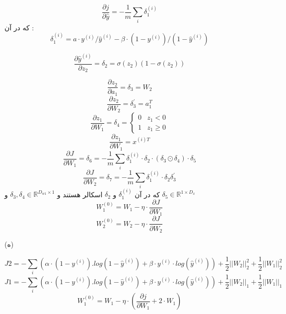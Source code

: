 \begin{equation}
    \frac{\partial j}{\partial \hat{y}} = -\frac{1}{m} \sum_{i} \delta_1^{(i)}    
\end{equation}
که در آن :
\begin{equation}
    \delta_1^{(i)} = a \cdot y^{(i)}/ \hat{y}^{(i)} - \beta \cdot (1-y^{(i)})/(1-\hat{y}^{(i)})
\end{equation}

\begin{equation}
    \frac{\partial \hat{y}^{(i)}}{\partial z_2} = \delta_2 = \sigma(z_2)(1-\sigma(z_2))
\end{equation}

\begin{equation}
    \frac{\partial z_2}{\partial a_1}=\delta_3=W_2
\end{equation}
\begin{equation}
    \frac{\partial z_2}{\partial W_2}=\delta^\prime_3=a^T_1
\end{equation}
\begin{equation}
    \frac{\partial z_1}{\partial W_1}=\delta_4= 
    \begin{cases}
    0&  z_1<0\\
    1& z_1\geq 0
\end{cases}
\end{equation}
\begin{equation}
    \frac{\partial z_1}{\partial W_1}=x^{(i)T}
\end{equation}
\begin{equation}
    \frac{\partial J}{\partial W_1}=\delta_6=-\frac{1}{m} \sum_i \delta_1^{(i)}\cdot \delta_2 \cdot (\delta_3 \odot \delta_4) \cdot \delta_5
\end{equation}
\begin{equation}
    \frac{\partial J}{\partial W_2}=\delta_7=-\frac{1}{m} \sum_i \delta_1^{(i)}\cdot \delta_2 \delta^\prime_3
\end{equation}
که در آن $\delta_1^{(i)}$ و $\delta_2$ اسکالر هستند و $\delta_3 , \delta_4 \in \mathbb{R}^{D_{w1} \times 1}$ و $\delta_5 \in \mathbb{R}^{1 \times D_x}$
\begin{equation}
    W_1^{(0)} = W_1 - \eta \cdot \frac{\partial J}{\partial W_1}
\end{equation}
\begin{equation}
    W_2^{(0)} = W_2 - \eta \cdot \frac{\partial J}{\partial W_2}
\end{equation}

(ه)

\begin{equation}
    J2 = - \sum_i (\alpha \cdot (1-y^{(i)}).log(1-\hat{y}^{(i)})+\beta \cdot y^{(i)} \cdot log(\hat{y}^{(i)})) + \frac{1}{2}||W_2||_2^2+\frac{1}{2}||W_1||_2^2
\end{equation}
\begin{equation}
    J1 = - \sum_i (\alpha \cdot (1-y^{(i)}).log(1-\hat{y}^{(i)})+\beta \cdot y^{(i)} \cdot log(\hat{y}^{(i)})) + \frac{1}{2}||W_2||_1+\frac{1}{2}||W_1||_1
\end{equation}
\begin{equation}
    W_1^{(0)} = W_1 -\eta \cdot (\frac{\partial j}{\partial W_1}+2 \cdot W_1)
\end{equation}
